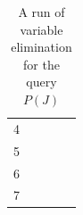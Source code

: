 \documentclass[12pt,a4paper]{article}
\begin{document}
\begin{table}[!h]
\begin{tabular}{c|l|l|l|l}
4    &                                                                                    &                                                                             &                                                                                   &                                                                          \\
5    &                                                                                    &                                                                             &                                                                                   &                                                                          \\
6    &                                                                                    &                                                                             &                                                                                   &                                                                          \\
7    &                                                                                    &                                                                             &                                                                                   &                                                                         
\end{tabular}
\caption{A run of variable elimination for the query $P(J)$}
\label{table:VE}
\end{table}



\end{document}
